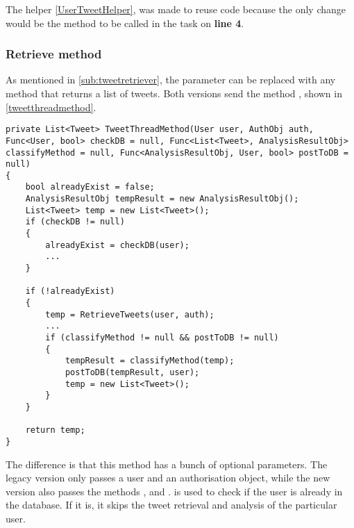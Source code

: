 The helper \autoref{UserTweetHelper}, was made to reuse code because the only
change would be the method to be called in the task on \textbf{line 4}.\\

\subsubsection{Retrieve method}
As mentioned in \autoref{sub:tweetretriever}, the 
parameter can be replaced with any method that returns a list of tweets. Both
versions send the method , shown in
\autoref{tweetthreadmethod}. \\

\begin{minipage}[H]{\linewidth}
\begin{lstlisting}[caption = The \textc{TweetThreadMethod} method., label =
tweetthreadmethod]
private List<Tweet> TweetThreadMethod(User user, AuthObj auth, Func<User, bool> checkDB = null, Func<List<Tweet>, AnalysisResultObj> classifyMethod = null, Func<AnalysisResultObj, User, bool> postToDB = null)
{
    bool alreadyExist = false;
    AnalysisResultObj tempResult = new AnalysisResultObj();
    List<Tweet> temp = new List<Tweet>();
    if (checkDB != null)
    {
        alreadyExist = checkDB(user);
		...
    }

    if (!alreadyExist)
    {
        temp = RetrieveTweets(user, auth);
		...	
        if (classifyMethod != null && postToDB != null)
        {
            tempResult = classifyMethod(temp); 
            postToDB(tempResult, user); 
            temp = new List<Tweet>();
        }
    }

    return temp;
}
\end{lstlisting}

\end{minipage}
The difference is that this method has a bunch of optional parameters. The
legacy version only passes a user and an authorisation object, while the new
version also passes the methods ,  and
.
 is used to check if the user is already in the database. If it
is, it skips the tweet retrieval and analysis of the particular user.\\

